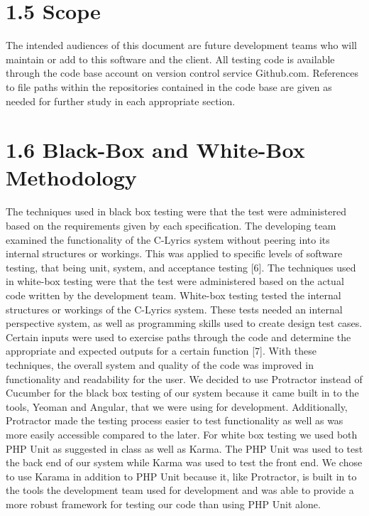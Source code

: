 \documentclass[]{article}
\begin{document}
\section{\textbf{1.5 Scope}}\label{scope}

The intended audiences of this document are future development teams who
will maintain or add to this software and the client. All testing code
is available through the code base account on version control service
Github.com. References to file paths within the repositories contained
in the code base are given as needed for further study in each
appropriate section.

\section{\textbf{1.6 Black-Box and White-Box
Methodology}}\label{black-box-and-white-box-methodology}

The techniques used in black box testing were that the test were
administered based on the requirements given by each specification. The
developing team examined the functionality of the C-Lyrics system
without peering into its internal structures or workings. This was
applied to specific levels of software testing, that being unit, system,
and acceptance testing {[}6{]}. The techniques used in white-box testing
were that the test were administered based on the actual code written by
the development team. White-box testing tested the internal structures
or workings of the C-Lyrics system. These tests needed an internal
perspective system, as well as programming skills used to create design
test cases. Certain inputs were used to exercise paths through the code
and determine the appropriate and expected outputs for a certain
function {[}7{]}. With these techniques, the overall system and quality
of the code was improved in functionality and readability for the user.
We decided to use Protractor instead of Cucumber for the black box
testing of our system because it came built in to the tools, Yeoman and
Angular, that we were using for development. Additionally, Protractor
made the testing process easier to test functionality as well as was
more easily accessible compared to the later. For white box testing we
used both PHP Unit as suggested in class as well as Karma. The PHP Unit
was used to test the back end of our system while Karma was used to test
the front end. We chose to use Karama in addition to PHP Unit because
it, like Protractor, is built in to the tools the development team used
for development and was able to provide a more robust framework for
testing our code than using PHP Unit alone.
\end{document}

